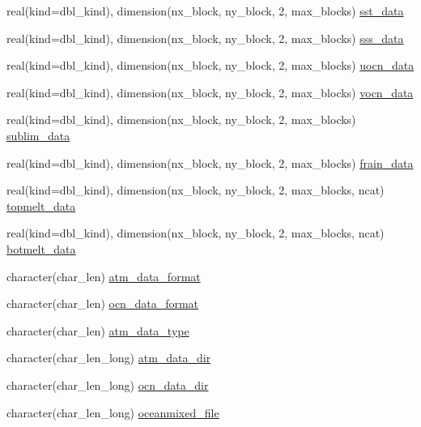 \begin{DoxyCompactItemize}
\item 
real(kind=dbl\_\-kind), dimension(nx\_\-block, ny\_\-block, 2, max\_\-blocks) \hyperlink{namespaceice__forcing_ab6d2ed507a72720751a324430fb30e40}{sst\_\-data}
\item 
real(kind=dbl\_\-kind), dimension(nx\_\-block, ny\_\-block, 2, max\_\-blocks) \hyperlink{namespaceice__forcing_afc0212ff56f8450191bde0697eec98c0}{sss\_\-data}
\item 
real(kind=dbl\_\-kind), dimension(nx\_\-block, ny\_\-block, 2, max\_\-blocks) \hyperlink{namespaceice__forcing_abf31afbe922f5e349590ae3e542e2116}{uocn\_\-data}
\item 
real(kind=dbl\_\-kind), dimension(nx\_\-block, ny\_\-block, 2, max\_\-blocks) \hyperlink{namespaceice__forcing_af9f5d7d98f0d9a7a1754c8e066a5ecc7}{vocn\_\-data}
\item 
real(kind=dbl\_\-kind), dimension(nx\_\-block, ny\_\-block, 2, max\_\-blocks) \hyperlink{namespaceice__forcing_aeefce6613d18c1281edaf501aa11ce4a}{sublim\_\-data}
\item 
real(kind=dbl\_\-kind), dimension(nx\_\-block, ny\_\-block, 2, max\_\-blocks) \hyperlink{namespaceice__forcing_a33507a33e635005acfc8ac3fcb8f330d}{frain\_\-data}
\item 
real(kind=dbl\_\-kind), dimension(nx\_\-block, ny\_\-block, 2, max\_\-blocks, ncat) \hyperlink{namespaceice__forcing_a76dd37d14a04398b8cddb3930e86f682}{topmelt\_\-data}
\item 
real(kind=dbl\_\-kind), dimension(nx\_\-block, ny\_\-block, 2, max\_\-blocks, ncat) \hyperlink{namespaceice__forcing_a3f2b5aab55a596bdea86fc066fb03fc9}{botmelt\_\-data}
\item 
character(char\_\-len) \hyperlink{namespaceice__forcing_a47d5ef141d5d07f3facede3ccda065b9}{atm\_\-data\_\-format}
\item 
character(char\_\-len) \hyperlink{namespaceice__forcing_a9d9be81629d968253c14a8c0a5984bda}{ocn\_\-data\_\-format}
\item 
character(char\_\-len) \hyperlink{namespaceice__forcing_a0a79982d0d62aeee3a33ef50513f3d23}{atm\_\-data\_\-type}
\item 
character(char\_\-len\_\-long) \hyperlink{namespaceice__forcing_ade690adebb1115f5b496db9148e05784}{atm\_\-data\_\-dir}
\item 
character(char\_\-len\_\-long) \hyperlink{namespaceice__forcing_a654560673c82ff131fd490ed0e7f36ff}{ocn\_\-data\_\-dir}
\item 
character(char\_\-len\_\-long) \hyperlink{namespaceice__forcing_aec28b3a9dba2ddef0ac023a96fc361bc}{oceanmixed\_\-file}

\end{DoxyCompactItemize}
